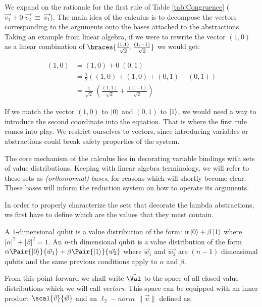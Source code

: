 We expand on the rationale for the first rule of Table \ref{tab:Congruence} ($\vec{v_1} + 0\; \vec{v_2}~\equiv~\vec{v_1}$). The main idea of the calculus is to decompose the vectors corresponding to the arguments onto the bases attached to the abstractions. Taking an example from linear algebra, if we were to rewrite the vector $(1,0)$ as a linear combination of $\braces{\frac{(1,1)}{\sqrt{2}}, \frac{(1,-1)}{\sqrt{2}}}$ we would get:

\begin{align*}
  (1,0) &= (1,0) + 0 \; (0,1) \\
  &=\frac{1}{2} ((1,0) + (1,0) + (0,1) - (0,1))\\
  &=\frac{1}{\sqrt{2}}\;\left(\frac{(1,1)}{\sqrt{2}} + \frac{(1,-1)}{\sqrt{2}}\right)  
\end{align*}

If we match the vector $(1,0)$ to $\left\vert{0}\right\rangle$ and $(0,1)$ to $\left\vert{1}\right\rangle$, we would need a way to introduce the second coordinate into the equation. That is where the first rule comes into play. We restrict ourselves to vectors, since introducing variables or abstractions could break safety properties of the system.

The core mechanism of the calculus lies in decorating variable bindings with sets of value distributions. Keeping with linear algebra terminology, we will refer to these sets as \textit{(orthonormal) bases}, for reasons which will shortly become clear. These bases will inform the reduction system on how to operate its arguments. 

In order to properly characterize the sets that decorate the lambda abstractions, we first have to define which are the values that they must contain.
\begin{definition}
  A $1$-dimensional qubit is a value distribution of the form: $\alpha \left\vert{0}\right\rangle + \beta \left\vert{1}\right\rangle$ where $|\alpha|^2 + |\beta|^2 = 1$. An $n$-th dimensional qubit is a value distribution of the form $\alpha\Pair{\ket{0}}{\vec w_1} + \beta\Pair{\ket{1}}{\vec{w_2}} $ where $\vec w_1$ and $\vec{w_2}$ are $(n-1)$ dimensional qubits and the same previous conditions apply to $\alpha$ and $\beta$.
\end{definition}

From this point forward we shall write $\vec{\Val}$ to the space of all closed value distributions which we will call \emph{vectors}. This space can be equipped with an inner product $\scal{\vec v}{\vec w}$ and an $\ell_2-norm$ $\|\vec v\|$ defined as:


